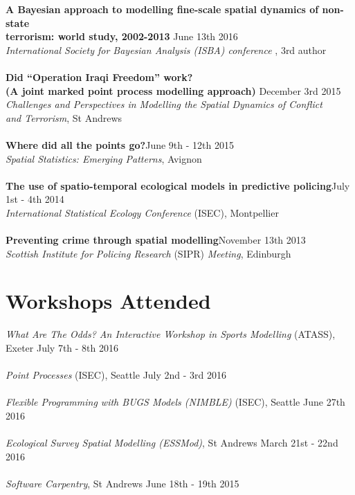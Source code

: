 \documentclass[10pt,letter]{article}
\begin{document}
{\textbf {A Bayesian approach to modelling fine-scale spatial dynamics of non-state\\
 terrorism: world study, 2002-2013 }}\hfill June 13th 2016\\
 {\sl International Society for Bayesian Analysis (ISBA) conference }, 3rd author\\
 \hdashrule[0.5ex]{4cm}{1pt}{1pt}\\
 {\textbf{Did ``Operation Iraqi Freedom'' work? \\
(A joint marked point process modelling approach) }}\hfill December 3rd 2015\\
 {\sl Challenges and Perspectives in Modelling the Spatial Dynamics of Conflict\\ and Terrorism}, St Andrews\\
 \hdashrule[0.5ex]{4cm}{1pt}{1pt}\\
{\textbf{Where did all the points go?}}\hfill June 9th - 12th 2015\\
 {\sl Spatial Statistics: Emerging Patterns}, Avignon\\
\hdashrule[0.5ex]{4cm}{1pt}{1pt}\\
 {\textbf{The use of spatio-temporal ecological models in predictive policing}}\hfill July 1st - 4th 2014\\
 {\sl International Statistical Ecology Conference} (ISEC), Montpellier\\
 \hdashrule[0.5ex]{4cm}{1pt}{1pt}\\
{\textbf{Preventing crime through spatial modelling}}\hfill November 13th 2013\\
 {\sl Scottish Institute for Policing Research} (SIPR) {\sl Meeting}, Edinburgh\\
 

\vspace{-2mm}


\section*{Workshops Attended}
\vspace{1mm}
{\sl What Are The Odds? An Interactive Workshop in Sports Modelling} (ATASS), Exeter \hfill July 7th - 8th 2016\\
\hdashrule[0.5ex]{4cm}{1pt}{1pt}\\
{\sl Point Processes} (ISEC), Seattle \hfill July 2nd - 3rd 2016\\
\hdashrule[0.5ex]{4cm}{1pt}{1pt}\\
{\sl Flexible Programming with BUGS Models (NIMBLE)} (ISEC), Seattle \hfill June 27th 2016\\
\hdashrule[0.5ex]{4cm}{1pt}{1pt}\\
{\sl Ecological Survey Spatial Modelling (ESSMod)}, St Andrews \hfill March 21st - 22nd 2016\\
 \hdashrule[0.5ex]{4cm}{1pt}{1pt}\\
 {\sl Software Carpentry}, St Andrews \hfill June 18th - 19th 2015\\
 
\end{document}
